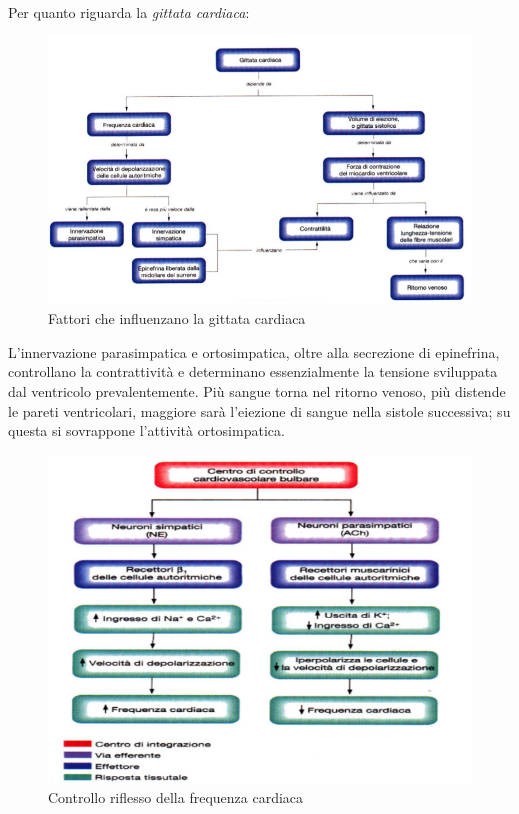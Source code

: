 \documentclass[a4paper,12pt]{article}
\begin{document}
Per quanto riguarda la \emph{gittata cardiaca}:
\begin{figure}[H]
\centering
\includegraphics[scale=0.45]{immagine/gittata.jpg}
\caption{Fattori che influenzano la gittata cardiaca}
\end{figure}
L'innervazione parasimpatica e ortosimpatica, oltre alla secrezione di epinefrina, controllano la contrattività e determinano essenzialmente la tensione sviluppata dal ventricolo prevalentemente. 
Più sangue torna nel ritorno venoso, più distende le pareti ventricolari, maggiore sarà l'eiezione di sangue nella sistole successiva; su questa si sovrappone l'attività ortosimpatica. 
\begin{figure}[H]
\centering
\includegraphics[scale=0.45]{immagine/controllo.jpg}
\caption{Controllo riflesso della frequenza cardiaca}
\end{figure}
\end{document}
